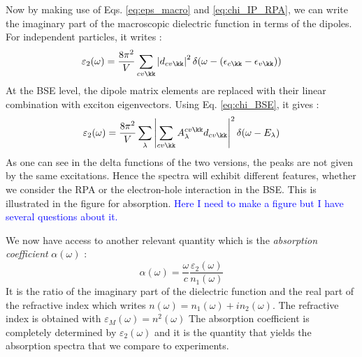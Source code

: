 Now by making use of Eqs. \eqref{eq:eps_macro} and \eqref{eq:chi_IP_RPA}, we can write the imaginary part of the macroscopic dielectric function in terms of the dipoles. For independent particles, it writes :
\begin{equation}
	\varepsilon_2(\omega) = \frac{8\pi^2}{V} \sum_{cv\kk} \left| d_{cv\kk} \right|^2 \delta(\omega - (\epsilon_{c\kk} - \epsilon_{v\kk}) ) \label{eq:eps_2_IP}
\end{equation}
At the \acrshort{BSE} level, the dipole matrix elements are replaced with their linear combination with exciton eigenvectors. Using Eq. \eqref{eq:chi_BSE}, it gives :
\begin{equation}
	\varepsilon_2(\omega) = \frac{8\pi^2}{V} \sum_\lambda \left| \sum_{cv\kk} A_\lambda^{cv\kk} d_{cv\kk} \right|^2 \delta(\omega - E_\lambda) \label{eq:eps_2_exc}
\end{equation}
As one can see in the delta functions of the two versions, the peaks are not given by the same excitations. Hence the spectra will exhibit different features, whether we consider the RPA or the electron-hole interaction in the BSE. This is illustrated in the figure for absorption. \textcolor{blue}{Here I need to make a figure but I have several questions about it.}

We now have access to another relevant quantity which is the \textit{absorption coefficient} $\alpha(\omega)$ :
\begin{equation}
	\alpha(\omega) = \frac{\omega}{c} \frac{\varepsilon_2(\omega)}{n_1(\omega)} \label{eq:abs_coeff}
\end{equation}
It is the ratio of the imaginary part of the dielectric function and the real part of the refractive index which writes $n(\omega) = n_1(\omega) + i n_2(\omega)$. The refractive index is obtained with $\varepsilon_M(\omega) = n^2(\omega)$
The absorption coefficient is completely determined by $\varepsilon_2(\omega)$ and it is the quantity that yields the absorption spectra that we compare to experiments.\cite{dressel2002electrodynamics}

